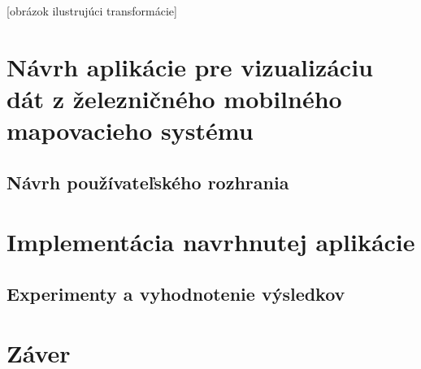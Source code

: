 [obrázok ilustrujúci transformácie]

\chapter{Návrh aplikácie pre vizualizáciu dát z železničného mobilného mapovacieho systému}

\section{Návrh používateľského rozhrania}

\chapter{Implementácia navrhnutej aplikácie}

\section{Experimenty a vyhodnotenie výsledkov}

\chapter{Záver}



%

